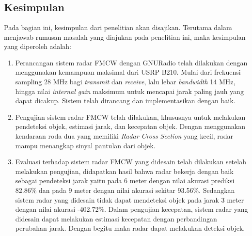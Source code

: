 \chapter{\babEnam}
\section{Kesimpulan}

Pada bagian ini, kesimpulan dari penelitian akan disajikan. Terutama dalam menjawab rumusan masalah yang diajukan pada penelitian ini, maka kesimpulan yang diperoleh adalah:

\begin{enumerate}
    \item Perancangan sistem radar FMCW dengan GNURadio telah dilakukan dengan menggunakan kemampuan maksimal dari USRP B210. Mulai dari frekuensi sampling 28 MHz bagi \textit{transmit} dan \textit{receive}, lalu lebar \textit{bandwidth} 14 MHz, hingga nilai \textit{internal gain} maksimum untuk mencapai jarak paling jauh yang dapat dicakup. Sistem telah dirancang dan implementasikan dengan baik.
    \item Pengujian sistem radar FMCW telah dilakukan, khususnya untuk melakukan pendeteksi objek, estimasi jarak, dan kecepatan objek. Dengan menggunakan kendaraan roda dua yang memiliki \textit{Radar Cross Section} yang kecil, radar mampu menangkap sinyal pantulan dari objek.
    \item Evaluasi terhadap sistem radar FMCW yang didesain telah dilakukan setelah melakukan pengujian, didapatkan hasil bahwa radar bekerja dengan baik sebagai pendeteksi jarak yaitu pada 6 meter dengan nilai akurasi prediksi 82.86\% dan pada 9 meter dengan nilai akurasi sekitar 93.56\%. Sedangkan sistem radar yang didesain tidak dapat mendeteksi objek pada jarak 3 meter dengan nilai akurasi -402.72\%. Dalam pengujian kecepatan, sistem radar yang didesain dapat melakukan estimasi kecepatan dengan perbandingan perubahan jarak. Dengan begitu maka radar dapat melakukan deteksi objek.
\end{enumerate}

